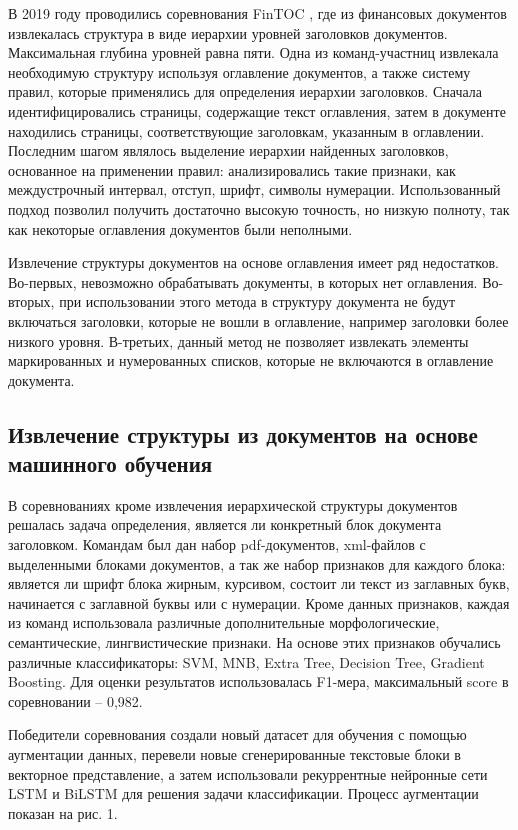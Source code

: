 \documentclass[10pt, a4paper]{ieeeconf}
\begin{document}
В 2019 году проводились соревнования FinTOC \cite{link4}, где из финансовых документов извлекалась структура в виде иерархии уровней заголовков документов. Максимальная глубина уровней равна пяти. Одна из команд-участниц \cite{link5} извлекала необходимую структуру используя оглавление документов, а также систему правил, которые применялись для определения иерархии заголовков.
Сначала идентифицировались страницы, содержащие текст оглавления, затем в документе находились страницы, соответствующие заголовкам, указанным в оглавлении. 
Последним шагом являлось выделение иерархии найденных заголовков, основанное на применении правил: анализировались такие признаки, как междустрочный интервал, отступ, шрифт, символы нумерации.
Использованный подход позволил получить достаточно высокую точность, но низкую полноту, так как некоторые оглавления документов были неполными.

Извлечение структуры документов на основе оглавления имеет ряд недостатков. Во-первых, невозможно обрабатывать документы, в которых нет оглавления. Во-вторых, при использовании этого метода в структуру документа не будут включаться заголовки, которые не вошли в оглавление, например заголовки более низкого уровня. В-третьих, данный метод не позволяет извлекать элементы маркированных и нумерованных списков, которые не включаются в оглавление документа.

\subsection{Извлечение структуры из документов на основе машинного обучения}

В соревнованиях \cite{link4} кроме извлечения иерархической структуры документов решалась задача определения, является ли конкретный блок документа заголовком. Командам был дан набор pdf-документов, xml-файлов с выделенными блоками документов, а так же набор признаков для каждого блока: является ли шрифт блока жирным, курсивом, состоит ли текст из заглавных букв, начинается с заглавной буквы или с нумерации. Кроме данных признаков, каждая из команд использовала различные дополнительные морфологические, семантические, лингвистические признаки. На основе этих признаков обучались различные классификаторы: SVM, MNB, Extra Tree, Decision Tree, Gradient Boosting. Для оценки результатов использовалась F1-мера, максимальный score в соревновании -- 0,982.

Победители соревнования \cite{link6} создали новый датасет для обучения с помощью аугментации данных, перевели новые сгенерированные текстовые блоки в векторное представление, а затем использовали рекуррентные нейронные сети LSTM и BiLSTM для решения задачи классификации. Процесс аугментации показан на рис. 1.
\end{document}
